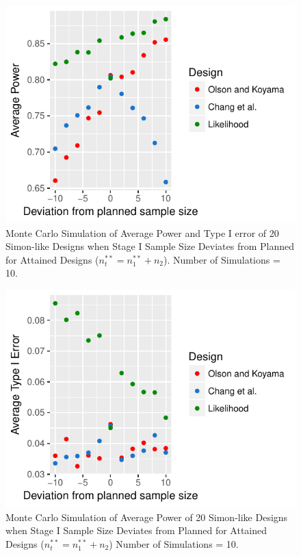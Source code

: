 \documentclass[12pt]{report}\usepackage[]{graphicx}\usepackage[]{color}
\newlength{\li}\setlength{\li}{14.48pt}
\begin{document}
\begin{figure}[]
\caption{Monte Carlo Simulation of Average Power and Type I error of 20 Simon-like Designs when Stage I Sample Size Deviates from Planned for Attained Designs ($n_t^{\ast\ast} = n_1^{\ast\ast} + n_2$). Number of Simulations = 10.}
\centering
\begin{Schunk}


\centerline{\includegraphics{unnamed-chunk-5-1} }

\end{Schunk}
\end{figure}
\begin{figure}[]
\caption{Monte Carlo Simulation of Average Power of 20 Simon-like Designs when Stage I Sample Size Deviates from Planned for Attained Designs ($n_t^{\ast\ast} = n_1^{\ast\ast} + n_2$) Number of Simulations = 10.}
\centering
\begin{Schunk}


\centerline{\includegraphics{unnamed-chunk-6-1} }

\end{Schunk}
\end{figure}
\end{document}
